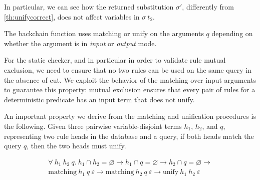 In particular, we can see how the returned substitution $\sigma'$, differently
from \cref{th:unifycorrect}, does not affect variables in $\sigma\ t_2$.





The backchain function uses matching or unify on the arguments $q$
depending on whether the argument is in \emph{input} or
\emph{output} mode.

For the static checker, and in particular in order to validate rule mutual
exclusion, we need to ensure that no two rules can be used on the same query in
the absence of cut. We exploit the behavior of the matching over input
arguments to guarantee this property: mutual exclusion ensures that every
pair of rules for a deterministic predicate has an input term that does
not unify.

An important property we derive from the matching and unification
procedures is the following. Given three pairwise variable-disjoint terms
$h_1$, $h_2$, and $q$, representing two rule heads in the database and a
query, if both heads match the query $q$, then the two heads must unify.

% 

\begin{lemma}\label{th:matchingunifytransP}%
\begin{multline*}
	\forall\ h_1\ h_2\ q .\ h_1 \cap h_2 = \varnothing \to h_1 \cap q = \varnothing \to h_2 \cap q = \varnothing \to \\
	\mathrm{matching}\ h_1\ q\ \varepsilon \to \mathrm{matching}\ h_2\ q\ \varepsilon \to \mathrm{unify}\ h_1\ h_2\ \varepsilon 
\end{multline*}
\end{lemma}

